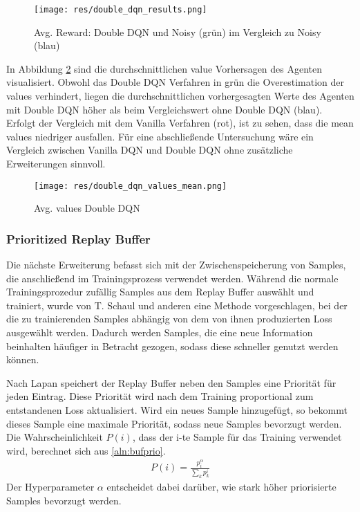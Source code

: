 \documentclass[11pt]{scrartcl}
\begin{document}
\begin{figure}[htp]
\centering
\texttt{[image: res/double\_dqn\_results.png]}
\caption{Avg. Reward: Double DQN und Noisy (grün) im Vergleich zu Noisy (blau)}
\label{fig:double-dqn}
\end{figure}

In Abbildung \ref{fig:double-dqn-value-mean} sind die durchschnittlichen value Vorhersagen
des Agenten visualisiert. Obwohl das Double DQN Verfahren in grün die Overestimation der
values verhindert, liegen die durchschnittlichen vorhergesagten Werte des Agenten mit
Double DQN höher als beim Vergleichswert ohne Double DQN (blau). Erfolgt der Vergleich mit
dem Vanilla Verfahren (rot), ist zu sehen, dass die mean values niedriger ausfallen. Für
eine abschließende Untersuchung wäre ein Vergleich zwischen Vanilla DQN und Double DQN
ohne zusätzliche Erweiterungen sinnvoll.

\begin{figure}[htp]
  \centering
  \texttt{[image: res/double\_dqn\_values\_mean.png]}
  \caption{Avg. values Double DQN}
  \label{fig:double-dqn-value-mean}
\end{figure}

\subsubsection{Prioritized Replay Buffer}
Die nächste Erweiterung befasst sich mit der Zwischenspeicherung von Samples, die
anschließend im Trainingsprozess verwendet werden. Während die normale Trainingsprozedur
zufällig Samples aus dem Replay Buffer auswählt und trainiert, wurde von T. Schaul und
anderen \cite{schaul2015prioritized} eine Methode vorgeschlagen, bei der die zu
trainierenden Samples abhängig von dem von ihnen produzierten Loss ausgewählt werden.
Dadurch werden Samples, die eine neue Information beinhalten häufiger in Betracht
gezogen, sodass diese schneller genutzt werden können.

Nach Lapan \cite[~S. 282]{L2018} speichert der Replay Buffer neben den Samples eine
Priorität für jeden Eintrag. Diese Priorität wird nach dem Training proportional zum
entstandenen Loss aktualisiert. Wird ein neues Sample hinzugefügt, so bekommt dieses
Sample eine maximale Priorität, sodass neue Samples bevorzugt werden. Die
Wahrscheinlichkeit $P(i)$, dass der i-te Sample für das Training verwendet wird, berechnet
sich aus \autoref{aln:bufprio}.
\begin{align}
  P(i) = \frac{p_i^\alpha}{\sum_k p_k^i}
\label{aln:bufprio}
\end{align}
\noindent
Der Hyperparameter $\alpha$ entscheidet dabei darüber, wie stark höher priorisierte
Samples bevorzugt werden.
\end{document}
